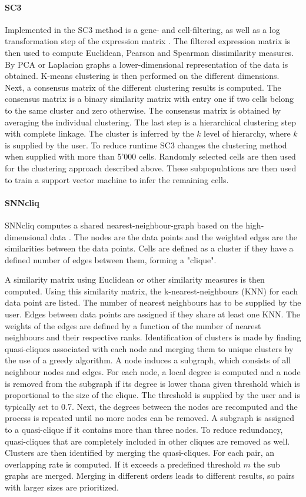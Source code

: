 \documentclass[11pt, a4paper]{article}\usepackage[]{graphicx}\usepackage[]{color}
\begin{document}
\paragraph{SC3}
Implemented in the SC3 method is a gene- and cell-filtering, as well as a log transformation step of the expression matrix \citep{kiselev2017sc3}. The filtered expression matrix is then used to compute  Euclidean, Pearson and  Spearman dissimilarity measures. By PCA or Laplacian graphs a lower-dimensional representation of the data is obtained.  K-means clustering is then performed on the different dimensions. Next, a consensus matrix of the different clustering results is computed. The consensus matrix is a binary similarity matrix with entry one if two cells belong to the same cluster and zero otherwise. The consensus matrix is obtained by averaging the individual clustering. The last step is a hierarchical clustering step with complete linkage. The cluster is inferred by the $k$ level of hierarchy, where $k$ is supplied by the user. To reduce runtime SC3 changes the clustering method when supplied with more than 5'000 cells. Randomly selected cells are then used for the clustering approach described above. These subpopulations are then used to train a support vector machine to infer the remaining cells.
\paragraph{SNNcliq}
SNNcliq computes a shared nearest-neighbour-graph based on the high-dimensional data \citep{xu2015identification}. The nodes are the data points and the weighted edges are the similarities between the data points. Cells are defined as a cluster if they have a defined number of edges between them, forming a "clique". 

A similarity matrix using Euclidean or other similarity measures is then computed. Using this similarity matrix, the k-nearest-neighbours (KNN) for each data point are listed. The number of nearest neighbours has to be supplied by the user. Edges between data points are assigned if they share at least one KNN. The weights of the edges are defined by a function of the number of nearest neighbours and their respective ranks. 
Identification of clusters is made by finding quasi-cliques associated with each node and merging them to unique clusters by the use of a greedy algorithm. A node induces a subgraph, which consists of all neighbour nodes and edges. For each node, a local degree is computed and a node is removed from the subgraph if its degree is lower thana given threshold which is proportional to the size of the clique. The threshold is supplied by the user and is typically set to 0.7. Next, the degrees between the nodes are recomputed and the process is repeated until no more nodes can be removed. A subgraph is assigned to a quasi-clique if it contains more than three nodes. To reduce redundancy, quasi-cliques that are completely included in other cliques are removed as well.
Clusters are then identified by merging the quasi-cliques. For each pair, an overlapping rate is computed. If it exceeds a predefined threshold $m$ the sub graphs are merged. Merging in different orders leads to different results, so pairs with larger sizes are prioritized.
\end{document}

